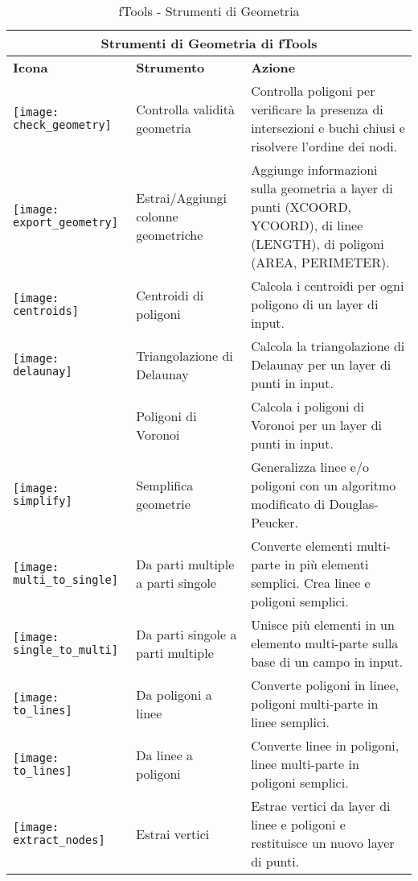 \begin{table}[ht]
\centering
\begin{tabular}{|m{1cm}|m{3cm}|m{12cm}|}
 \hline \multicolumn{3}{|c|}{\textbf{Strumenti di Geometria di fTools}} \\
 \hline \textbf{Icona} & \textbf{Strumento} & \textbf{Azione} \\
 \hline \texttt{[image: check\_geometry]} & Controlla validità geometria & 
Controlla poligoni per verificare la presenza di intersezioni e buchi chiusi e 
risolvere l'ordine dei nodi. \\
 \hline \texttt{[image: export\_geometry]} & Estrai/Aggiungi colonne geometriche & 
Aggiunge informazioni sulla geometria a layer di punti (XCOORD, YCOORD), di linee
(LENGTH), di poligoni (AREA, PERIMETER). \\
 \hline \texttt{[image: centroids]} & Centroidi di poligoni & 
Calcola i centroidi per ogni poligono di un layer di input. \\
 \hline \texttt{[image: delaunay]} & Triangolazione di Delaunay & 
Calcola la triangolazione di Delaunay per un layer di punti in input. \\
 \hline  & Poligoni di Voronoi & 
Calcola i poligoni di Voronoi per un layer di punti in input. \\
 \hline \texttt{[image: simplify]} & Semplifica geometrie & 
Generalizza linee e/o poligoni con un algoritmo modificato di Douglas-Peucker. \\
 \hline \texttt{[image: multi\_to\_single]} & Da parti multiple a parti singole & 
Converte elementi multi-parte in più elementi semplici. Crea linee e poligoni semplici. \\
 \hline \texttt{[image: single\_to\_multi]} & Da parti singole a parti multiple & 
Unisce più elementi in un elemento multi-parte sulla base di un campo in input. \\
 \hline \texttt{[image: to\_lines]} & Da poligoni a linee & Converte 
poligoni in linee, poligoni multi-parte in linee semplici. \\
 \hline \texttt{[image: to\_lines]} & Da linee a poligoni & Converte 
linee in poligoni, linee multi-parte in poligoni semplici. \\
 \hline \texttt{[image: extract\_nodes]} & Estrai vertici & Estrae 
vertici  da layer di linee e poligoni e restituisce un nuovo layer di punti. \\
 \hline
\end{tabular}
\caption{fTools - Strumenti di Geometria}\label{tab:ftool_geometry}
\end{table}

